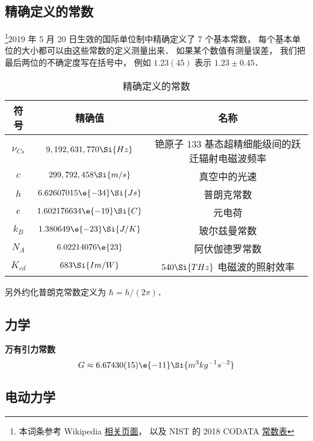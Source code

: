 

\subsection{精确定义的常数}
\footnote{本词条参考 Wikipedia \href{https://en.wikipedia.org/wiki/Physical_constant}{相关页面}， 以及 NIST 的 2018 CODATA \href{https://physics.nist.gov/cuu/Constants/Table/allascii.txt}{常数表}}2019 年 5 月 20 日生效的国际单位制中精确定义了 7 个基本常数， 每个基本单位的大小都可以由这些常数的定义测量出来． 如果某个数值有测量误差， 我们把最后两位的不确定度写在括号中， 例如 $1.23(45)$ 表示 $1.23 \pm 0.45$．
\begin{table}[ht]
\centering
\caption{精确定义的常数}\label{Consts_tab1}
\begin{tabular}{|c|c|c|}
\hline
符号 & 精确值 & 名称 \\
\hline
$\nu_{Cs}$ & $9,192,631,770\Si{Hz}$ & 铯原子 133 基态超精细能级间的跃迁辐射电磁波频率 \\
\hline
$c$ & $299,792,458\Si{m/s}$ & 真空中的光速 \\
\hline
$h$ & $6.62607015\e{-34}\Si{Js}$ & 普朗克常数 \\
\hline
$e$ & $1.602176634\e{-19}\Si{C} $ & 元电荷 \\
\hline
$k_B$ & $1.380649\e{-23} \Si{J/K}$ & 玻尔兹曼常数 \\
\hline
$N_A$ & $6.02214076\e{23} $ & 阿伏伽德罗常数 \\
\hline
$K_{cd}$ & $683\Si{Im/W}$ & $540\Si{THz}$ 电磁波的照射效率 \\
\hline
\end{tabular}
\end{table}
另外约化普朗克常数定义为 $\hbar = h/(2\pi)$．


\subsection{力学}
\textbf{万有引力常数}
\begin{equation}
G \approx 6.67430(15)\e{-11} \Si{m^3 kg^{-1} s^{-2}}
\end{equation}

\subsection{电动力学}

